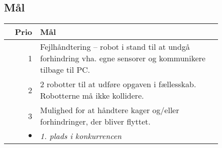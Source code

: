 \subsection{Mål}
\begin{tabular}{r p{0.85\linewidth}}
	\textbf{Prio} & \textbf{Mål} \\
	\hline
	1 & Fejlhåndtering -- robot i stand til at undgå forhindring vha. egne sensorer og kommunikere tilbage til PC.\\
	2 & 2 robotter til at udføre opgaven i fællesskab. Robotterne må ikke kollidere.\\
	3 & Mulighed for at håndtere kager og/eller forhindringer, der bliver flyttet. \\
	$\bullet$  & \textit{1. plads i konkurrencen}
\end{tabular}
